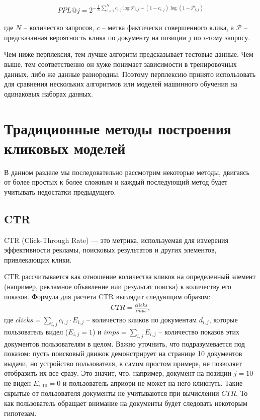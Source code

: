 \documentclass[diploma]{nanolab2015}
\begin{document}
\begin{align}
    PPL@j = 2^{-\frac{1}{N}\sum_{i=1}^{N}c_{i,j}\log\mathcal{P}_{i,j} + (1 - c_{i,j})\log(1 - \mathcal{P}_{i,j}) }
\end{align}

где $N$ -- количество запросов, $c$ -- метка фактически совершенного клика, а $\mathcal{P}$ -- предсказанная вероятность клика по документу на позиции $j$ по $i$-тому запросу.

Чем ниже перплексия, тем лучше алгоритм предсказывает тестовые данные. Чем выше, тем соответственно он хуже понимает зависимости в тренировочных данных, либо же данные разнородны. Поэтому перплексию принято использовать для сравнения нескольких алгоритмов или моделей машинного обучения на одинаковых наборах данных.

\section{Традиционные методы построения кликовых моделей}
В данном разделе мы последовательно рассмотрим некоторые методы, двигаясь от более простых к более сложным и каждый последующий метод будет учитывать недостатки предыдущего.
\subsection{CTR}
CTR (Click-Through Rate) — это метрика, используемая для измерения эффективности рекламы, поисковых результатов и других элементов, привлекающих клики. %

CTR рассчитывается как отношение количества кликов на определенный элемент (например, рекламное объявление или результат поиска) к количеству его показов. Формула для расчета CTR выглядит следующим образом:
\begin{align}
    CTR = \frac{clicks}{imps},
\end{align}
где $clicks = \sum_{i,j} c_{i,j} \cdot E_{i,j}$ -- количество кликов по документам $d_{i,j}$, которые пользователь видел ($E_{i,j}=1$) и $imps = \sum_{i,j}E_{i,j}$ -- количество показов этих документов пользователям в целом. Важно уточнить, что подразумевается под показом: пусть поисковый движок демонстрирует на странице 10 документов выдачи, но устройство пользователя, в самом простом примере, не позволяет отобразить их все сразу. Это значит, что, например, документ на позиции $j=10$ не виден $E_{i,10} = 0$ и пользователь априори не может на него кликнуть. Такие скрытые от пользователя документы не учитываются при вычислении $CTR$. То как пользователь обращает внимание на документы будет следовать некоторым гипотезам.
\end{document}
